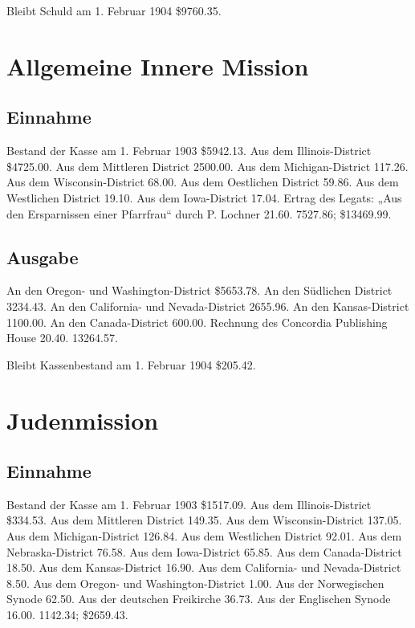 Bleibt Schuld am 1. Februar 1904 \$9760.35.

\section{Allgemeine Innere Mission}

\subsection{Einnahme}

Bestand der Kasse am 1. Februar 1903 \$5942.13. Aus dem Illinois-District \$4725.00. Aus dem Mittleren District 2500.00. Aus dem Michigan-District 117.26. Aus dem Wisconsin-District 68.00. Aus dem Oestlichen District 59.86. Aus dem Westlichen District 19.10. Aus dem Iowa-District 17.04. Ertrag des Legats: „Aus den Ersparnissen einer Pfarrfrau“ durch P. Lochner 21.60. 7527.86; \$13469.99.

\subsection{Ausgabe}

An den Oregon- und Washington-District \$5653.78. An den Südlichen District 3234.43. An den California- und Nevada-District 2655.96. An den Kansas-District 1100.00. An den Canada-District 600.00. Rechnung des Concordia Publishing House 20.40. 13264.57.

Bleibt Kassenbestand am 1. Februar 1904 \$205.42.

\section{Judenmission}

\subsection{Einnahme}

Bestand der Kasse am 1. Februar 1903 \$1517.09. Aus dem Illinois-District \$334.53. Aus dem Mittleren District 149.35. Aus dem Wisconsin-District 137.05. Aus dem Michigan-District 126.84. Aus dem Westlichen District 92.01. Aus dem Nebraska-District 76.58. Aus dem Iowa-District 65.85. Aus dem Canada-District 18.50. Aus dem Kansas-District 16.90. Aus dem California- und Nevada-District 8.50. Aus dem Oregon- und Washington-District 1.00. Aus der Norwegischen Synode 62.50. Aus der deutschen Freikirche 36.73. Aus der Englischen Synode 16.00. 1142.34; \$2659.43.

